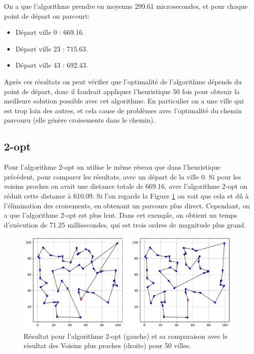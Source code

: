 \documentclass[a4paper,11pt,fleqn]{article}
\begin{document}
On a que l'algorithme prendre en moyenne 299.61 microsecondes, et pour chaque point de départ on parcourt:
\begin{itemize}[noitemsep,topsep=5pt]
    \item Départ ville 0 : 669.16.
    \item Départ ville 23 : 715.63.
    \item Départ ville 43 : 692.43.
\end{itemize}

Après ces résultats on peut vérifier que l'optimalité de l'algorithme dépends du point de départ, donc il faudrait appliquer l'heuristique 50 fois pour obtenir la meilleure solution possible avec cet algorithme. En particulier on a une ville qui est trop loin des autres, et cela cause de problèmes avec l'optimalité du chemin parcouru (elle génère croisements dans le chemin).

\subsection*{2-opt}
Pour l'algorithme 2-opt on utilise le même réseau que dans l'heuristique précédent, pour comparer les résultats, avec un départ de la ville 0. Si pour les voisins proches on avait une distance totale de 669.16, avec l'algorithme 2-opt on réduit cette distance à 610.09. Si l'on regarde la Figure \ref{fig:2opt-nn} on voit que cela et dû à l'élimination des croisements, en obtenant un parcours plus direct. Cependant, on a que l'algorithme 2-opt est plus lent. Dans cet exemple, on obtient un temps d'exécution de 71.25 millisecondes, qui est trois ordres de magnitude plus grand.

\begin{figure}[H]
    \centering
    \includegraphics[width=\textwidth]{images/2opt_50_villes_nn.pdf}
    \caption{Résultat pour l'algorithme 2-opt (gauche) et sa comparaison avec le résultat des Voisins plus proches (droite) pour 50 villes.}
    \label{fig:2opt-nn}
\end{figure}
\end{document}
